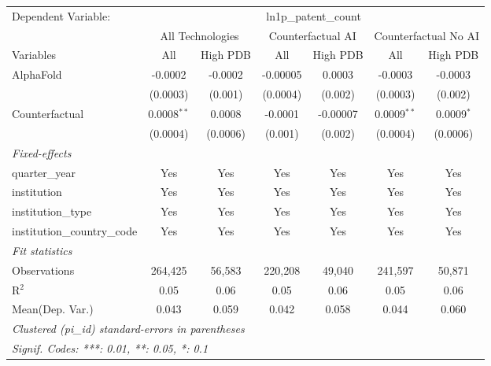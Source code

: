 \begingroup
\centering
\begin{tabular}{lcccccc}
   \tabularnewline \midrule \midrule
   Dependent Variable: & \multicolumn{6}{c}{ln1p\_patent\_count}\\
 & \multicolumn{2}{c}{All Technologies} & \multicolumn{2}{c}{Counterfactual AI} & \multicolumn{2}{c}{Counterfactual No AI} \\
\cmidrule(lr){1-1}\cmidrule(lr){2-3} \cmidrule(lr){4-5} \cmidrule(lr){6-7}
Variables & \multicolumn{1}{c}{All} & \multicolumn{1}{c}{High PDB} & \multicolumn{1}{c}{All} & \multicolumn{1}{c}{High PDB} & \multicolumn{1}{c}{All} & \multicolumn{1}{c}{High PDB} \\
\cmidrule(lr){1-1}\cmidrule(lr){2-2} \cmidrule(lr){3-3} \cmidrule(lr){4-4} \cmidrule(lr){5-5} \cmidrule(lr){6-6} \cmidrule(lr){7-7}
   AlphaFold                    & -0.0002       & -0.0002  & -0.00005 & 0.0003   & -0.0003       & -0.0003\\   
                                & (0.0003)      & (0.001)  & (0.0004) & (0.002)  & (0.0003)      & (0.002)\\   
   Counterfactual               & 0.0008$^{**}$ & 0.0008   & -0.0001  & -0.00007 & 0.0009$^{**}$ & 0.0009$^{*}$\\   
                                & (0.0004)      & (0.0006) & (0.001)  & (0.002)  & (0.0004)      & (0.0006)\\   
   \midrule
   \emph{Fixed-effects}\\
   quarter\_year                & Yes           & Yes      & Yes      & Yes      & Yes           & Yes\\  
   institution                  & Yes           & Yes      & Yes      & Yes      & Yes           & Yes\\  
   institution\_type            & Yes           & Yes      & Yes      & Yes      & Yes           & Yes\\  
   institution\_country\_code   & Yes           & Yes      & Yes      & Yes      & Yes           & Yes\\  
   \midrule
   \emph{Fit statistics}\\
   Observations                 & 264,425       & 56,583   & 220,208  & 49,040   & 241,597       & 50,871\\  
   R$^2$                        & 0.05          & 0.06     & 0.05     & 0.06     & 0.05          & 0.06\\  
Mean(Dep. Var.) & 0.043 & 0.059 & 0.042 & 0.058 & 0.044 & 0.060 \\
   \midrule \midrule
   \multicolumn{7}{l}{\emph{Clustered (pi\_id) standard-errors in parentheses}}\\
   \multicolumn{7}{l}{\emph{Signif. Codes: ***: 0.01, **: 0.05, *: 0.1}}\\
\end{tabular}
\par\endgroup
